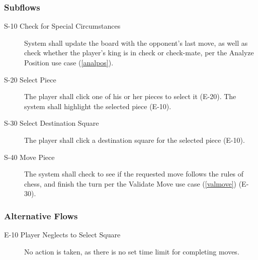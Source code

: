 \subsubsection{Subflows}
\begin{description}
\item[S-10 Check for Special Circumstances] System shall update the board with the opponent's last move, as well as check whether the player's king is in check or check-mate, per the Analyze Position use case (\ref{analpos}). 
\item[S-20 Select Piece] The player shall click one of his or her pieces to select it (E-20). The system shall highlight the selected piece (E-10).
\item[S-30 Select Destination Square]  The player shall click a destination square for the selected piece (E-10).
\item[S-40 Move Piece] The system shall check to see if the requested move follows the rules of chess, and finish the turn per the Validate Move use case (\ref{valmove}) (E-30).
\end{description}
\subsubsection{Alternative Flows}
\begin{description}
\item[E-10 Player Neglects to Select Square] No action is taken, as there is no set time limit for completing moves.
\end{description}
